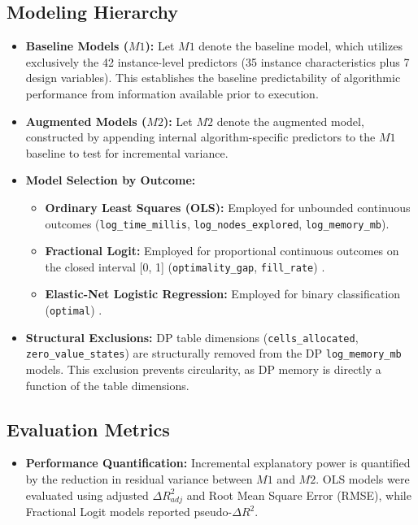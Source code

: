 \documentclass[11pt,a4paper]{article}
\begin{document}
\subsection{Modeling Hierarchy}
\begin{itemize}
  \item \textbf{Baseline Models ($M1$):} Let $M1$ denote the baseline model, which utilizes exclusively the 42 instance-level predictors (35 instance characteristics plus 7 design variables). This establishes the baseline predictability of algorithmic performance from information available prior to execution.
  \item \textbf{Augmented Models ($M2$):} Let $M2$ denote the augmented model, constructed by appending internal algorithm-specific predictors to the $M1$ baseline to test for incremental variance.
  \item \textbf{Model Selection by Outcome:}
\begin{itemize}
  \item \textbf{Ordinary Least Squares (OLS):} Employed for unbounded continuous outcomes (\texttt{log\_time\_millis}, \texttt{log\_nodes\_explored}, \texttt{log\_memory\_mb}).
  \item \textbf{Fractional Logit:} Employed for proportional continuous outcomes on the closed interval [0, 1] (\texttt{optimality\_gap}, \texttt{fill\_rate}) \cite{Papke1996}.
  \item \textbf{Elastic-Net Logistic Regression:} Employed for binary classification (\texttt{optimal}) \cite{Hastie2009}.
\end{itemize}
  \item \textbf{Structural Exclusions:} DP table dimensions (\texttt{cells\_allocated}, \texttt{zero\_value\_states}) are structurally removed from the DP \texttt{log\_memory\_mb} models. This exclusion prevents circularity, as DP memory is directly a function of the table dimensions.
\end{itemize}

\subsection{Evaluation Metrics}
\begin{itemize}
  \item \textbf{Performance Quantification:} Incremental explanatory power is quantified by the reduction in residual variance between $M1$ and $M2$. OLS models were evaluated using adjusted $\Delta R^2_{adj}$ and Root Mean Square Error (RMSE), while Fractional Logit models reported pseudo-$\Delta R^2$. 
\end{itemize}
\end{document}
